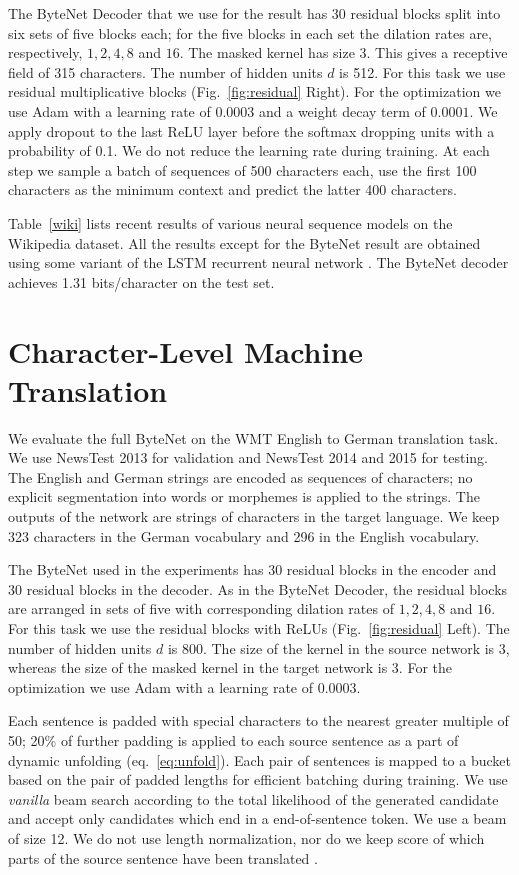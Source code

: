 The ByteNet Decoder that we use for the result has 30 residual blocks split into six sets of five blocks each; for the five blocks in each set the dilation rates are, respectively, $1,2,4,8$ and $16$. The masked kernel has size 3. This gives a receptive field of 315 characters. The number of hidden units $d$ is 512.  For this task we use residual multiplicative blocks  (Fig.~\ref{fig:residual} Right). For the optimization we use Adam \citep{DBLP:journals/corr/KingmaB14} with a learning rate of $0.0003$ and a weight decay term of $0.0001$. We apply dropout to the last ReLU layer before the softmax dropping units with a probability of 0.1. We do not reduce the learning rate during training. At each step we sample a batch of sequences of 500 characters each, use the first 100 characters as the minimum context and predict the latter 400 characters.

Table~\ref{wiki} lists recent results of various neural sequence models on the Wikipedia dataset. All the results except for the ByteNet result are obtained using some variant of the LSTM recurrent neural network \citep{hochreiter1997long}. The ByteNet decoder achieves 1.31 bits/character on the test set.

\section{Character-Level Machine Translation}

We evaluate the full ByteNet on the WMT English to German translation task. We use NewsTest 2013 for validation and NewsTest 2014 and 2015 for testing. The English and German strings are encoded as sequences of characters; no explicit segmentation into words or morphemes is applied to the strings. The outputs of the network are strings of characters in the target language. We keep 323 characters in the German vocabulary and 296 in the English vocabulary.

The ByteNet used in the experiments has 30 residual blocks in the encoder and 30 residual blocks in the decoder. As in the ByteNet Decoder, the residual blocks are arranged in sets of five with corresponding dilation rates of $1,2,4,8$ and $16$. For this task we use the residual blocks with ReLUs (Fig.~\ref{fig:residual} Left). The number of hidden units $d$ is 800. The size of the kernel in the source network is $3$, whereas the size of the masked kernel in the target network is $3$. For the optimization we use Adam with a learning rate of $0.0003$.

Each sentence is padded with special characters to the nearest greater multiple of 50; 20\% of further padding is applied to each source sentence as a part of dynamic unfolding (eq.~\ref{eq:unfold}). Each pair of sentences is mapped to a bucket based on the pair of padded lengths for efficient batching during training. We use \emph{vanilla} beam search according to the total likelihood of the generated candidate and accept only candidates which end in a end-of-sentence token. We use a beam of size 12. We do  not use length normalization, nor do we keep score of which parts of the source sentence have been translated \citep{wu2016}.

